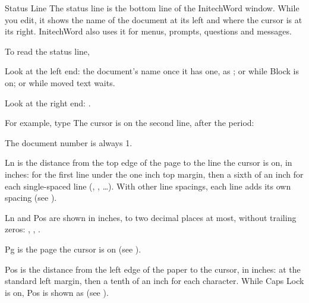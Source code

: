 \begin{Feature}{Status Line}
The status line is the bottom line of the InitechWord window.  While you
edit, it shows the name of the document at its left and where the cursor is
at its right.  InitechWord also uses it for menus, prompts, questions and
messages.

To read the status line,
\begin{WPSteps}
\item Look at the left end: the document's name once it has one, as
; or  while Block is on; or
 while moved text waits.
\item Look at the right end: .
\end{WPSteps}

For example, type
The cursor is on the second line, after the period:
\EndReplay

\Notes
{}
The document number is always 1.

Ln is the distance from the top edge of the page to the line the cursor is
on, in inches:  for the first line under the one inch top margin,
then a sixth of an inch for each single-spaced line (,
, \ldots).  With other line spacings, each line adds its own
spacing (see ).

Ln and Pos are shown in inches, to two decimal places at most, without
trailing zeros: , , .

Pg is the page the cursor is on (see ).

Pos is the distance from the left edge of the paper to the cursor, in
inches:  at the standard left margin, then a tenth of an inch for
each character.  While Caps Lock is on, Pos is shown as  (see
).

\end{Feature}
